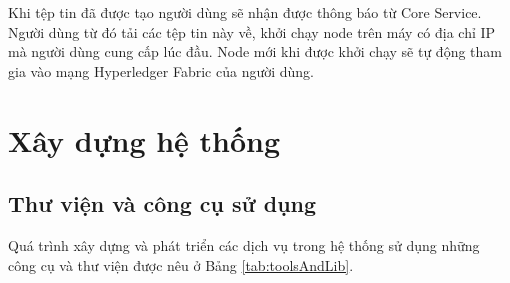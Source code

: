 \documentclass[../DoAn.tex]{subfiles}
\begin{document}
Khi tệp tin đã được tạo người dùng sẽ nhận được thông báo từ Core Service.
Người dùng từ đó tải các tệp tin này về, khởi chạy node trên máy có địa chỉ IP
mà người dùng cung cấp lúc đầu. Node mới khi được khởi chạy sẽ tự động tham gia
vào mạng Hyperledger Fabric của người dùng.

\section{Xây dựng hệ thống}
\subsection{Thư viện và công cụ sử dụng}
Quá trình xây dựng và phát triển các dịch vụ trong hệ thống sử dụng những công
cụ và thư viện được nêu ở Bảng \ref{tab:toolsAndLib}.
\end{document}
